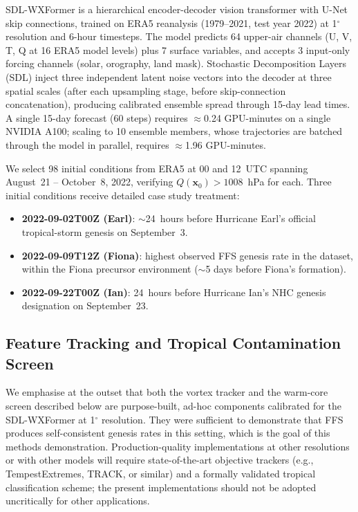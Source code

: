\documentclass[11pt]{article}
\begin{document}
SDL-WXFormer \citep{schreck2025sdl} is a hierarchical encoder-decoder vision transformer
with U-Net skip connections, trained on ERA5 reanalysis \citep{hersbach2020era5} (1979--2021,
test year 2022) at 1$^\circ$ resolution and 6-hour timesteps.
The model predicts 64 upper-air channels (U, V, T, Q at 16 ERA5 model levels) plus 7 surface
variables, and accepts 3 input-only forcing channels (solar, orography, land mask).
Stochastic Decomposition Layers (SDL) inject three independent latent noise vectors
into the decoder at three spatial scales (after each upsampling stage, before
skip-connection concatenation), producing calibrated ensemble spread through 15-day
lead times.
A single 15-day forecast (60 steps) requires $\approx$0.24 GPU-minutes on a single
NVIDIA A100; scaling to 10 ensemble members, whose trajectories are batched through
the model in parallel, requires $\approx$1.96 GPU-minutes.

We select 98 initial conditions from ERA5 at 00 and 12~UTC spanning August~21 --
October~8, 2022, verifying $Q(\mathbf{x}_0) > 1008$~hPa for each. Three initial
conditions receive detailed case study treatment:
\begin{itemize}\setlength\itemsep{2pt}
\item \textbf{2022-09-02T00Z (Earl)}: $\sim$24~hours before Hurricane Earl's official
      tropical-storm genesis on September~3.
\item \textbf{2022-09-09T12Z (Fiona)}: highest observed FFS genesis rate in the
      dataset, within the Fiona precursor environment ($\sim$5 days before Fiona's formation).
\item \textbf{2022-09-22T00Z (Ian)}: 24~hours before Hurricane Ian's NHC
      genesis designation on September~23.
\end{itemize}

\subsection{Feature Tracking and Tropical Contamination Screen}

We emphasise at the outset that both the vortex tracker and the warm-core screen
described below are purpose-built, ad-hoc components calibrated for the SDL-WXFormer
at 1$^\circ$ resolution.
They were sufficient to demonstrate that FFS produces self-consistent genesis rates
in this setting, which is the goal of this methods demonstration.
Production-quality implementations at other resolutions or with other models
will require state-of-the-art objective trackers (e.g., TempestExtremes, TRACK,
or similar) and a formally validated tropical classification scheme;
the present implementations should not be adopted uncritically for other applications.
\end{document}
